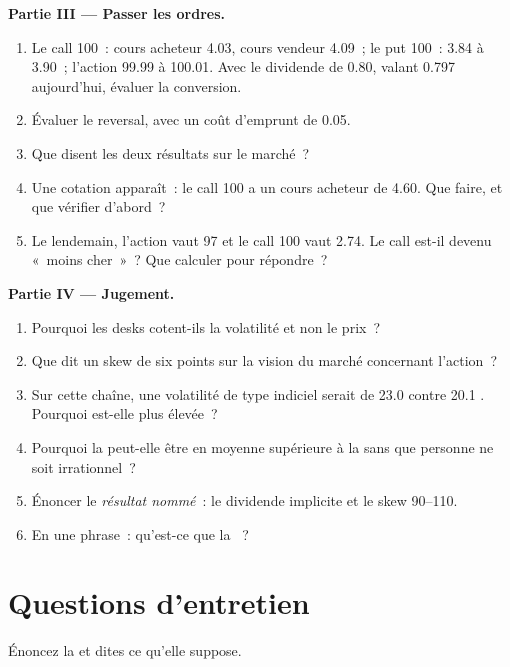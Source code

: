 \begin{problem}
\medskip\noindent\textbf{Partie III --- Passer les ordres.}
\begin{enumerate}[resume]
\item Le call 100~: cours acheteur 4.03, cours vendeur 4.09~; le put 100~: 3.84 à 3.90~;
l'action 99.99 à 100.01. Avec le dividende de 0.80, valant 0.797 aujourd'hui, évaluer la
conversion.
\item Évaluer le reversal, avec un coût d'emprunt de 0.05.
\item Que disent les deux résultats sur le marché~?
\item Une cotation apparaît~: le call 100 a un cours acheteur de 4.60. Que faire, et que vérifier
d'abord~?
\item Le lendemain, l'action vaut 97 et le call 100 vaut 2.74. Le call est-il
devenu «~moins cher~»~? Que calculer pour répondre~?
\end{enumerate}

\medskip\noindent\textbf{Partie IV --- Jugement.}
\begin{enumerate}[resume]
\item Pourquoi les desks cotent-ils la volatilité et non le prix~?
\item Que dit un skew de six points sur la vision du marché concernant
l'action~?
\item Sur cette chaîne, une volatilité de type indiciel serait de 23.0 contre 20.1 . Pourquoi est-elle plus élevée~?
\item Pourquoi la  peut-elle être en moyenne supérieure à la 
sans que personne ne soit irrationnel~?
\item Énoncer le \emph{résultat nommé}~: le dividende implicite et le
skew 90--110.
\item En une phrase~: qu'est-ce que la ~?
\end{enumerate}
\end{problem}

\section{Questions d'entretien}

\begin{interviewq}\label{iq:m1:volatility-first-contact:1}
Énoncez la  et dites ce qu'elle suppose.
\end{interviewq}

